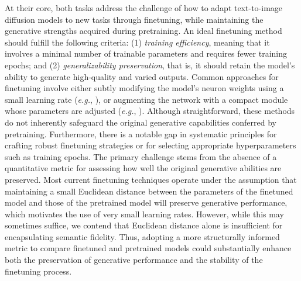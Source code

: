 At their core, both tasks address the challenge of how to adapt text-to-image diffusion models to new tasks through finetuning, while maintaining the generative strengths acquired during pretraining. An ideal finetuning method should fulfill the following criteria: (1) \emph{training efficiency}, meaning that it involves a minimal number of trainable parameters and requires fewer training epochs; and (2) \emph{generalizability preservation}, that is, it should retain the model’s ability to generate high-quality and varied outputs. Common approaches for finetuning involve either subtly modifying the model’s neuron weights using a small learning rate (\emph{e.g.}, \cite{ruiz2023dreambooth}), or augmenting the network with a compact module whose parameters are adjusted (\emph{e.g.}, \cite{hulora2022,zhang2023adding}). Although straightforward, these methods do not inherently safeguard the original generative capabilities conferred by pretraining. Furthermore, there is a notable gap in systematic principles for crafting robust finetuning strategies or for selecting appropriate hyperparameters such as training epochs. The primary challenge stems from the absence of a quantitative metric for assessing how well the original generative abilities are preserved. Most current finetuning techniques operate under the assumption that maintaining a small Euclidean distance between the parameters of the finetuned model and those of the pretrained model will preserve generative performance, which motivates the use of very small learning rates. However, while this may sometimes suffice, we contend that Euclidean distance alone is insufficient for encapsulating semantic fidelity. Thus, adopting a more structurally informed metric to compare finetuned and pretrained models could substantially enhance both the preservation of generative performance and the stability of the finetuning process.


